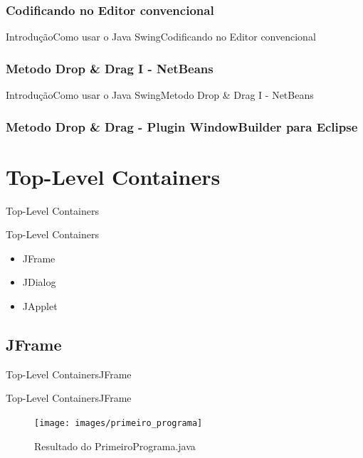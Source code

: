 \documentclass[10pt]{beamer}
\begin{document}
\subsubsection{Codificando no Editor convencional}
\begin{frame}{Introdução}{Como usar o Java Swing}{Codificando no Editor convencional}

\end{frame}{}
\subsubsection{Metodo Drop \& Drag I - NetBeans}
\begin{frame}{Introdução}{Como usar o Java Swing}{Metodo Drop \& Drag I - NetBeans}
\end{frame}{}
\subsubsection{Metodo Drop \& Drag - Plugin WindowBuilder para Eclipse}
\begin{frame}
\end{frame}{}


			
\section{Top-Level Containers}
\begin{frame}{Top-Level Containers}{}
\end{frame}{}
\begin{frame}{Top-Level Containers}
\begin{itemize}
\item JFrame
\item JDialog
\item JApplet
\end{itemize}
\end{frame}{}

\subsection{JFrame}
\begin{frame}{Top-Level Containers}{JFrame}

\end{frame}{}
\begin{frame}{Top-Level Containers}{JFrame}
\begin{figure}[!htb]
    \centering
	\texttt{[image: images/primeiro\_programa]}
    \caption{Resultado do PrimeiroPrograma.java}
    \label{figRotulo}
  \end{figure}
\end{frame}{}
\end{document}
